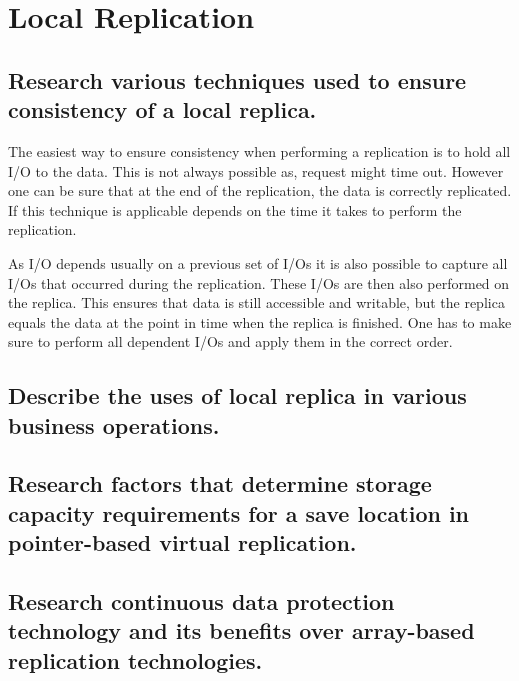 \section{Local Replication} %
\label{sec:local_replication}

\subsection{Research various techniques used to ensure consistency of a local replica.} %
\label{sub:research_various_techniques_used_to_ensure_consistency_of_a_local_replica}
	The easiest way to ensure consistency when performing a replication
	is to hold all I/O to the data.
	This is not always possible as,
	request might time out.
	However one can be sure that at the end of the replication,
	the data is correctly replicated.
	If this technique is applicable depends on the time it
	takes to perform the replication.

	As I/O depends usually on a previous set of I/Os
	it is also possible to capture all I/Os that occurred during the replication.
	These I/Os are then also performed on the replica.
	This ensures that data is still accessible and writable,
	but the replica equals the data at the point in time
	when the replica is finished.
	One has to make sure to perform all dependent I/Os
	and apply them in the correct order.

\subsection{Describe the uses of local replica in various business operations.} %
\label{sub:describe_the_uses_of_local_replica_in_various_business_operations}
	

\subsection{Research factors that determine storage capacity requirements for a save location in pointer-based virtual replication.} %
\label{sub:research_factors_that_determine_storage_capacity_requirements_for_a_save_location_in_pointer_based_virtual_replication}


\subsection{Research continuous data protection technology and its benefits over array-based replication technologies.} %
\label{sub:research_continuous_data_protection_technology_and_its_benefits_over_array_based_replication_technologies}


